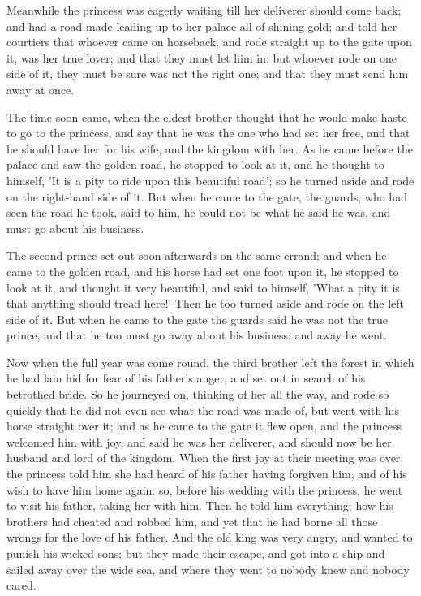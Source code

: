 \documentclass[12pt]{book}
\begin{document}
Meanwhile the princess was eagerly waiting till her deliverer should
come back; and had a road made leading up to her palace all of shining
gold; and told her courtiers that whoever came on horseback, and rode
straight up to the gate upon it, was her true lover; and that they
must let him in: but whoever rode on one side of it, they must be sure
was not the right one; and that they must send him away at once.

The time soon came, when the eldest brother thought that he would make
haste to go to the princess, and say that he was the one who had set
her free, and that he should have her for his wife, and the kingdom
with her. As he came before the palace and saw the golden road, he
stopped to look at it, and he thought to himself, 'It is a pity to
ride upon this beautiful road'; so he turned aside and rode on the
right-hand side of it. But when he came to the gate, the guards, who
had seen the road he took, said to him, he could not be what he said
he was, and must go about his business.

The second prince set out soon afterwards on the same errand; and when
he came to the golden road, and his horse had set one foot upon it, he
stopped to look at it, and thought it very beautiful, and said to
himself, 'What a pity it is that anything should tread here!' Then he
too turned aside and rode on the left side of it. But when he came to
the gate the guards said he was not the true prince, and that he too
must go away about his business; and away he went.

Now when the full year was come round, the third brother left the
forest in which he had lain hid for fear of his father's anger, and
set out in search of his betrothed bride. So he journeyed on, thinking
of her all the way, and rode so quickly that he did not even see what
the road was made of, but went with his horse straight over it; and as
he came to the gate it flew open, and the princess welcomed him with
joy, and said he was her deliverer, and should now be her husband and
lord of the kingdom. When the first joy at their meeting was over, the
princess told him she had heard of his father having forgiven him, and
of his wish to have him home again: so, before his wedding with the
princess, he went to visit his father, taking her with him. Then he
told him everything; how his brothers had cheated and robbed him, and
yet that he had borne all those wrongs for the love of his father. And
the old king was very angry, and wanted to punish his wicked sons; but
they made their escape, and got into a ship and sailed away over the
wide sea, and where they went to nobody knew and nobody cared.
\end{document}
